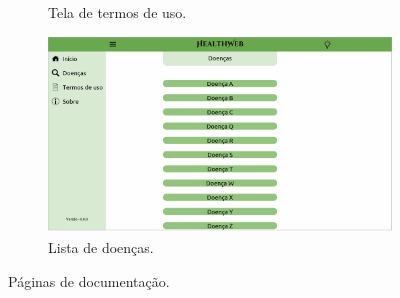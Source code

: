 \begin{figure}[htbp]
\begin{subfigure}{0.49\linewidth}
		\caption{Tela de termos de uso.}
		\label{fig:desktop:terms}
	\end{subfigure}
	\hfill
	\begin{subfigure}{0.49\linewidth}
		\centering
		\includegraphics[width=\linewidth]{figure/prototype/desktop/list_disease.png}
		\caption{Lista de doenças.}
		\label{fig:desktop:list_disease}
	\end{subfigure}
	\caption{Páginas de documentação.}
	\label{fig:desktop:drawer_about_terms_list_disease}
\end{figure}

